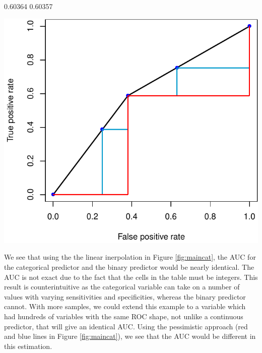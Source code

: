 \documentclass[article]{jss}
\let\origfigure\figure
\let\endorigfigure\endfigure
\renewenvironment{figure}[1][2] {
    \expandafter\origfigure\expandafter[H]
} {
    \endorigfigure
}
\begin{document}
\begin{CodeChunk}

\begin{CodeOutput}
[1] 0.60364 0.60357
\end{CodeOutput}
\begin{figure}[H]

{\centering \includegraphics{index_revision_files/figure-latex/maincat-1} 

}

\caption[ROC curve of a 4-level categorical variable compared to the binary predictor]{ROC curve of a 4-level categorical variable compared to the binary predictor. Here we present the ROC curve of a categorical predictor (blue points) compared to that of the binary predictor (black line).  We see that the ROC curve is identical if the linear inerpolation is used (accounting for ties).  The red and blue lines show the ROC of the binary and categorical predictor, respectively, using the pessimistic approach.  We believe this demonstrates that although there is more gradation in the categorical variable, using the standard approach provides the same AUC, though we believe these variables have different levels of information as the binary predictor cannot obtain values other than the 2 categories.  }\label{fig:maincat}
\end{figure}
\end{CodeChunk}

We see that using the the linear inerpolation in Figure
\ref{fig:maincat}, the AUC for the categorical predictor and the binary
predictor would be nearly identical. The AUC is not exact due to the
fact that the cells in the table must be integers. This result is
counterintuitive as the categorical variable can take on a number of
values with varying sensitivities and specificities, whereas the binary
predictor cannot. With more samples, we could extend this example to a
variable which had hundreds of variables with the same ROC shape, not
unlike a continuous predictor, that will give an identical AUC. Using
the pessimistic approach (red and blue lines in Figure
\ref{fig:maincat}), we see that the AUC would be different in this
estimation.
\end{document}
